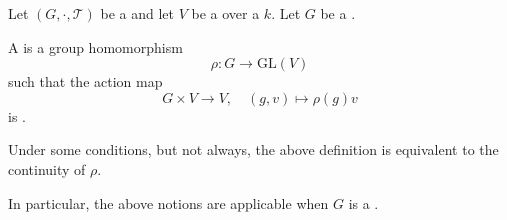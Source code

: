 \begin{definition} \label{definition:continuous_representation_of_a_topological_group_on_a_topological_module_over_a_topological_ring}
    Let $(G,\cdot,\mathcal{T})$ be a  and let $V$ be a  over a  $k$. Let $G$ be a . 


    A  is a group homomorphism
    $$ \rho : G \to \mathrm{GL}(V)$$
    such that the action map 
    $$G \times V \to V, \quad (g,v) \mapsto \rho(g) v$$ 
    is .

    Under some conditions, but not always, the above definition is equivalent to the continuity of $\rho$.


    In particular, the above notions are applicable when $G$ is a .
\end{definition}
